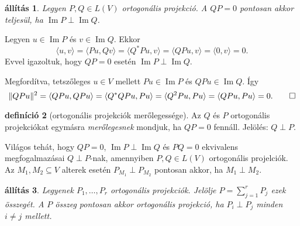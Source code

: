 \documentclass[9pt, a4paper, showtrims]{memoir}
\makeatletter
\renewenvironment{proof}[1][\proofname]
    {\par\pushQED{\qed}%
    \normalfont \topsep6\p@\@plus6\p@\relax
    \trivlist
    \item[\hskip\labelsep
        \itshape
    #1\@addpunct{:}]\ignorespaces}
    {\popQED\endtrivlist\@endpefalse}
\theoremstyle{plain}
\newtheorem{proposition}{állítás}[chapter]
\theoremstyle{remark}
\theoremstyle{definition}
\newtheorem{definition}[proposition]{definíció}
\DeclareMathOperator{\im}{Im}
\newcommand{\ip}[2]{\langle#1,#2\rangle}
\makeatother
\begin{document}
\begin{proposition}
    Legyen $P,Q\in L\left( V \right)$ ortogonális projekció.
    A $QP=0$ pontosan akkor teljesül, ha $\im P\perp\im Q$.
\end{proposition}
\begin{proof}
    Legyen $u\in \im P$ és $v\in \im Q$.
    Ekkor
    \[
        \ip{u}{v}
        =
        \ip{Pu}{Qv}
        =
        \ip{Q^\ast Pu}{v}
        =
        \ip{QPu}{v}
        =
        \ip{0}{v}
        =
        0.
    \]
    Evvel igazoltuk, hogy $QP=0$ esetén $\im P\perp\im Q$.

    Megfordítva, tetszőleges $u\in V$ mellett $Pu\in\im P$ és $QPu\in\im Q$.
    Így
    \[
        \|QPu\|^2
        =
        \ip{QPu}{QPu}
        =
        \ip{Q^\ast QPu}{Pu}
        =
        \ip{Q^2Pu}{Pu}
        =
        \ip{QPu}{Pu}
        =
        0.
        \qedhere
    \]
\end{proof}
\begin{definition}[ortogonális projekciók merőlegessége]
    Az $Q$ és $P$ ortogonális projekciókat egymásra \emph{merőlegesnek} mondjuk, ha $QP=0$ fennáll.
    Jelölés: $Q\perp P$.
\end{definition}
Világos tehát, hogy $QP=0$, $\im P\perp \im Q$ és $PQ=0$ ekvivalens megfogalmazásai $Q\perp P$-nak,
amennyiben $P,Q\in L\left( V \right)$ ortogonális projelciók.
Az $M_1, M_2\subseteq V$ alterek esetén $P_{M_1}\perp P_{M_2}$ pontosan akkor, ha $M_1\perp M_2$.
\begin{proposition}
    Legyenek $P_1,\dots,P_r$ ortogonális projekciók.
    Jelölje $P=\sum_{j=1}^rP_j$ ezek összegét.
    A $P$ összeg pontosan akkor ortogonális projekció, ha $P_i\perp P_j$ minden $i\neq j$ mellett.
\end{proposition}
\end{document}
